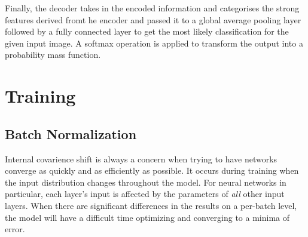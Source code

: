 \documentclass[conference]{IEEEtran}
\begin{document}
\begin{table}[H]
    \centering
    \caption{MobileNet V2 head for CIFAR 10
    dataset.}\label{table:MobileNetCifar10HeadArchitecture}
\end{table}

Finally, the decoder takes in the encoded information and categorises the strong
features derived fromt he encoder and passed it to a global average pooling
layer followed by a fully connected layer to get the most likely classification
for the given input image. A softmax operation is applied to transform the
output into a probability mass function.







\section{Training} %


\subsection{Batch Normalization}

Internal covarience shift is always a concern when trying to have networks
converge as quickly and as efficiently as possible. It occurs during training
when the input distribution changes throughout the model. For neural networks in
particular, each layer's input is affected by the parameters of \textit{all}
other input layers. When there are significant differences in the results on a
per-batch level, the model will have a difficult time optimizing and converging
to a minima of error.
\end{document}
